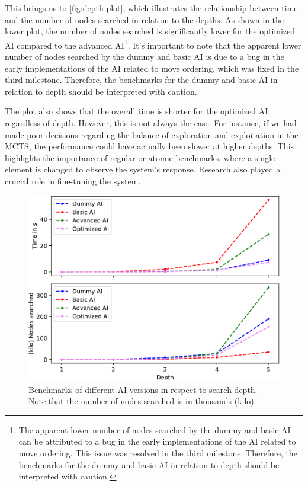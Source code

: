 This brings us to \autoref{fig:depth-plot}, which illustrates the relationship between time and the number of nodes searched in relation to the depths. As shown in the lower plot, the number of nodes searched is significantly lower for the optimized AI compared to the advanced AI\footnote{
The apparent lower number of nodes searched by the dummy and basic AI can be attributed to a bug in the early implementations of the AI related to move ordering. This issue was resolved in the third milestone. Therefore, the benchmarks for the dummy and basic AI in relation to depth should be interpreted with caution.
}. It's important to note that the apparent lower number of nodes searched by the dummy and basic AI is due to a bug in the early implementations of the AI related to move ordering, which was fixed in the third milestone. Therefore, the benchmarks for the dummy and basic AI in relation to depth should be interpreted with caution.

The plot also shows that the overall time is shorter for the optimized AI, regardless of depth. However, this is not always the case. For instance, if we had made poor decisions regarding the balance of exploration and exploitation in the MCTS, the performance could have actually been slower at higher depths. This highlights the importance of regular or atomic benchmarks, where a single element is changed to observe the system's response. Research also played a crucial role in fine-tuning the system.

\begin{figure}[hbtp]
	\centering
	\includegraphics[width=.8\linewidth, page=1]{reference/pics/plot-depths.pdf}
	\captionsetup{justification=centering}
	\caption{Benchmarks of different AI versions in respect to search depth.\\Note that the number of nodes searched is in thousands (kilo).}
	\label{fig:depth-plot}
\end{figure}

\pagebreak
